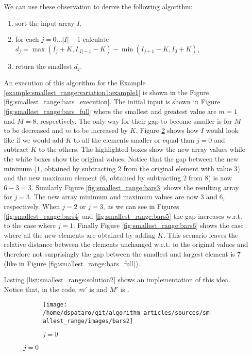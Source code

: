 We can use these observation to derive the following algorithm:
\begin{enumerate}
	\item sort the input array $I$,
	\item for each $j = 0 \ldots |I|-1$ calculate $d_j = \max{(I_j+K,I_{|I|-1}-K)} -
	\min{(I_{j+1}-K, I_0 +K)}$,
	\item return the smallest $d_j$.
\end{enumerate}
An execution of this algorithm for the Example \ref{example:smallest_range:variation1:example1} is
shown in the Figure \ref{fig:smallest_range:bars_execution}. The initial input is shown in Figure
\ref{fig:smallest_range:bars_full} where the smallest and greatest value are $m=1$ and $M=8$,
respectively. The only way for their gap to become smaller is for $M$ to be decreased and $m$ to be
increased by $K$. Figure \ref{fig:smallest_range:bars2} shows how $I$ would look like if we would
add $K$ to all the elements smaller or equal than $j=0$ and subtract $K$ to the others. The
highlighted boxes show the new array values while the white boxes show the original values. Notice
that the gap between the new minimum ($1$, obtained by subtracting $2$ from the original element
with value $3$) and the new maximum element ($6$, obtained by subtracting $2$ from $8$) is now
$6-3=3$. Similarly Figure \ref{fig:smallest_range:bars3} shows the resulting array for $j=3$. The
new array minimum and maximum values are now $3$ and $6$, respectively. When $j=2$ or $j=3$, as we
can see in Figures \ref{fig:smallest_range:bars4} and \ref{fig:smallest_range:bars5} the gap
increases w.r.t. to the case where $j=1$. Finally Figure \ref{fig:smallest_range:bars6} shows the
case where all the new elements are obtained by adding $K$. This scenario leaves the relative
distance between the elements unchanged w.r.t. to the original values and therefore not surprisingly
the gap between the smallest and largest element is $7$ (like in Figure
\ref{fig:smallest_range:bars_full}).


Listing \ref{list:smallest_range:solution2} shows an implementation of this idea. Notice that, in
the code, $m'$ is  and $M'$ is .


\begin{figure}[bp!]
	\centering	
	\begin{subfigure}[t]{0.99\textwidth}
			\centering
			\texttt{[image: /home/dspataro/git/algorithm\_articles/sources/smallest\_range/images/bars2]}
			\caption{$j=0$}
			\label{fig:smallest_range:bars2}
	\end{subfigure}
\end{figure}

